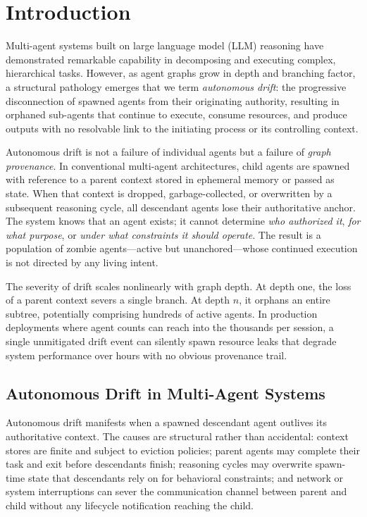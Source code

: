\section{Introduction}

Multi-agent systems built on large language model (LLM) reasoning have demonstrated remarkable capability in decomposing and executing complex, hierarchical tasks. However, as agent graphs grow in depth and branching factor, a structural pathology emerges that we term \emph{autonomous drift}: the progressive disconnection of spawned agents from their originating authority, resulting in orphaned sub-agents that continue to execute, consume resources, and produce outputs with no resolvable link to the initiating process or its controlling context.

Autonomous drift is not a failure of individual agents but a failure of \emph{graph provenance}. In conventional multi-agent architectures, child agents are spawned with reference to a parent context stored in ephemeral memory or passed as state. When that context is dropped, garbage-collected, or overwritten by a subsequent reasoning cycle, all descendant agents lose their authoritative anchor. The system knows that an agent exists; it cannot determine \emph{who authorized it}, \emph{for what purpose}, or \emph{under what constraints it should operate}. The result is a population of zombie agents—active but unanchored—whose continued execution is not directed by any living intent.

The severity of drift scales nonlinearly with graph depth. At depth one, the loss of a parent context severs a single branch. At depth $n$, it orphans an entire subtree, potentially comprising hundreds of active agents. In production deployments where agent counts can reach into the thousands per session, a single unmitigated drift event can silently spawn resource leaks that degrade system performance over hours with no obvious provenance trail.

\subsection{Autonomous Drift in Multi-Agent Systems}

Autonomous drift manifests when a spawned descendant agent outlives its authoritative context. The causes are structural rather than accidental: context stores are finite and subject to eviction policies; parent agents may complete their task and exit before descendants finish; reasoning cycles may overwrite spawn-time state that descendants rely on for behavioral constraints; and network or system interruptions can sever the communication channel between parent and child without any lifecycle notification reaching the child.

